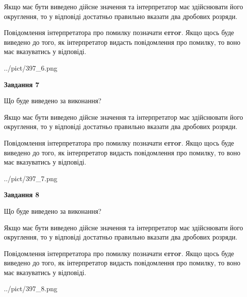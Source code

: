 \documentclass[12pt, ukrainian]{article}
\begin{document}
{\begin {Large}
Якщо має бути виведено дійсне значення та інтерпретатор має здійснювати його округлення, 
то у відповіді достатньо правильно вказати два дробових розряди.

Повідомлення інтерпретатора про помилку позначати \textbf{error}.
Якщо щось буде виведено до того, як інтерпретатор видасть повідомлення про помилку, 
то воно має вказуватись у відповіді. \par

\begin{center}
	{../pict/397_6.png}
\end{center}
\newpage

{\begin {center}\textbf{Завдання 7}\end {center}}\par
Що буде виведено за виконання? \par

Якщо має бути виведено дійсне значення та інтерпретатор має здійснювати його округлення, 
то у відповіді достатньо правильно вказати два дробових розряди.

Повідомлення інтерпретатора про помилку позначати \textbf{error}.
Якщо щось буде виведено до того, як інтерпретатор видасть повідомлення про помилку, 
то воно має вказуватись у відповіді. \par

\begin{center}
	{../pict/397_7.png}
\end{center}
\newpage

{\begin {center}\textbf{Завдання 8}\end {center}}\par
Що буде виведено за виконання? \par

Якщо має бути виведено дійсне значення та інтерпретатор має здійснювати його округлення, 
то у відповіді достатньо правильно вказати два дробових розряди.

Повідомлення інтерпретатора про помилку позначати \textbf{error}.
Якщо щось буде виведено до того, як інтерпретатор видасть повідомлення про помилку, 
то воно має вказуватись у відповіді. \par

\begin{center}
	{../pict/397_8.png}
\end{center}
\newpage


\end{Large}}
\end{document}
